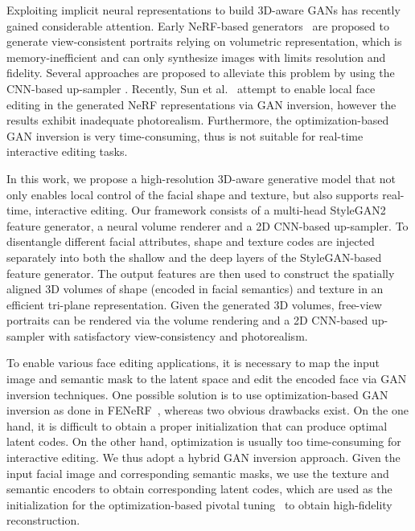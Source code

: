\documentclass[acmtog]{acmart}
\begin{document}
Exploiting implicit neural representations to build 3D-aware GANs has recently gained considerable attention. Early NeRF-based generators~\cite{chan2021pi,schwarz2020graf} are proposed to generate view-consistent portraits relying on volumetric representation, which is memory-inefficient and can only synthesize images with limits resolution and fidelity. Several approaches are proposed to alleviate this problem by using the CNN-based up-sampler \cite{gu2021stylenerf, eg3d, xue2022giraffe, niemeyer2021giraffe,xu2021volumegan,orel2021stylesdf}. Recently, Sun et al.~\cite{sun2021fenerf} attempt to enable local face editing in the generated NeRF representations via GAN inversion, however the results exhibit inadequate photorealism. Furthermore, the optimization-based GAN inversion is very time-consuming, thus is not suitable for real-time interactive editing tasks.

In this work, we propose a high-resolution 3D-aware generative model that not only enables local control of the facial shape and texture, but also supports real-time, interactive editing. Our framework consists of a multi-head StyleGAN2 feature generator, a neural volume renderer and a 2D CNN-based up-sampler. To disentangle different facial attributes, shape and texture codes are injected separately into both the shallow and the deep layers of the StyleGAN-based feature generator. The output features are then used to construct the spatially aligned 3D volumes of shape (encoded in facial semantics) and texture in an efficient tri-plane representation. Given the generated 3D volumes, free-view portraits can be rendered via the volume rendering and a 2D CNN-based up-sampler with satisfactory view-consistency and photorealism. 

To enable various face editing applications, it is necessary to map the input image and semantic mask to the latent space and edit the encoded face via GAN inversion techniques. One possible solution is to use optimization-based GAN inversion as done in FENeRF~\cite{sun2021fenerf}, whereas two obvious drawbacks exist. On the one hand, it is difficult to obtain a proper initialization that can produce optimal latent codes. On the other hand, optimization is usually too time-consuming for interactive editing. We thus adopt a hybrid GAN inversion approach. Given the input facial image and corresponding semantic masks, we use the texture and semantic encoders to obtain corresponding latent codes, which are used as the initialization for the optimization-based pivotal tuning~\cite{roich2021pivotal} to obtain high-fidelity reconstruction. 
\end{document}
